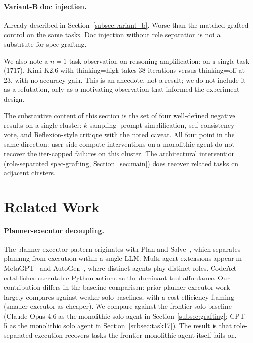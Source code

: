 \documentclass[conference]{IEEEtran}
\newcommand{\Kimi}{Kimi K2.6}
\newcommand{\Opus}{Claude Opus 4.6}
\begin{document}
\paragraph{Variant-B doc injection.}
Already described in Section~\ref{subsec:variant_b}. Worse than the matched grafted control on the same tasks. Doc injection without role separation is not a substitute for spec-grafting.

We also note a $n=1$ task observation on reasoning amplification: on a single task (1717), \Kimi{} with thinking=high takes 38 iterations versus thinking=off at 23, with no accuracy gain. This is an anecdote, not a result; we do not include it as a refutation, only as a motivating observation that informed the experiment design.

The substantive content of this section is the set of four well-defined negative results on a single cluster: $k$-sampling, prompt simplification, self-consistency vote, and Reflexion-style critique with the noted caveat. All four point in the same direction: user-side compute interventions on a monolithic agent do not recover the iter-capped failures on this cluster. The architectural intervention (role-separated spec-grafting, Section~\ref{sec:main}) does recover related tasks on adjacent clusters.

\section{Related Work}
\label{sec:related}

\paragraph{Planner-executor decoupling.}
The planner-executor pattern originates with Plan-and-Solve~\cite{planAndSolve2023}, which separates planning from execution within a single LLM. Multi-agent extensions appear in MetaGPT~\cite{metagpt2023} and AutoGen~\cite{autogen2023}, where distinct agents play distinct roles. CodeAct~\cite{codeAct2024} establishes executable Python actions as the dominant tool affordance. Our contribution differs in the baseline comparison: prior planner-executor work largely compares against weaker-solo baselines, with a cost-efficiency framing (smaller-executor as cheaper). We compare against the frontier-solo baseline (\Opus{} as the monolithic solo agent in Section~\ref{subsec:grafting}; GPT-5 as the monolithic solo agent in Section~\ref{subsec:task17}). The result is that role-separated execution recovers tasks the frontier monolithic agent itself fails on.
\end{document}
